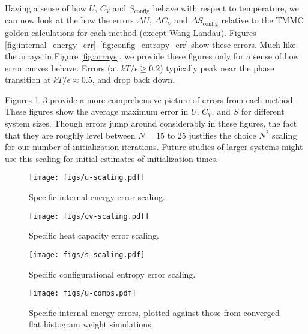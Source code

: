 \documentclass[11pt]{article}
\renewcommand{\t}{\text} %
\begin{document}
Having a sense of how $U$, $C_V$ and $S_{\t{config}}$ behave with
respect to temperature, we can now look at the how the errors $\Delta
U$, $\Delta C_V$ and $\Delta S_{\t{config}}$ relative to the TMMC
golden calculations for each method (except Wang-Landau). Figures
\ref{fig:internal_energy_err}--\ref{fig:config_entropy_err} show these
errors. Much like the arrays in Figure \ref{fig:arrays}, we provide
these figures only for a sense of how error curves behave. Errors (at
$kT/\epsilon\ge0.2$) typically peak near the phase transition at
$kT/\epsilon\approx0.5$, and drop back down.

Figures \ref{fig:u_scaling}--\ref{fig:s_scaling} provide a more
comprehensive picture of errors from each method. These figures show
the average maximum error in $U$, $C_V$, and $S$ for different system
sizes. Though errors jump around considerably in these figures, the
fact that they are roughly level between $N=15$ to $25$ justifies the
choice $N^2$ scaling for our number of initialization iterations.
Future studies of larger systems might use this scaling for initial
estimates of initialization times.

\begin{figure}[p]
  \centering
  \texttt{[image: figs/u-scaling.pdf]}
  \caption[Internal energy error scaling]
  {Specific internal energy error scaling.}
  \label{fig:u_scaling}
\end{figure}

\begin{figure}[p]
  \centering
  \texttt{[image: figs/cv-scaling.pdf]}
  \caption[Heat capacity error scaling]
  {Specific heat capacity error scaling.}
  \label{fig:cv_scaling}
\end{figure}

\begin{figure}[p]
  \centering
  \texttt{[image: figs/s-scaling.pdf]}
  \caption[Configurational entropy error scaling]
  {Specific configurational entropy error scaling.}
  \label{fig:s_scaling}
\end{figure}


\begin{figure}[p]
  \centering
  \texttt{[image: figs/u-comps.pdf]}
  \caption[Internal energy error comparisons]
  {Specific internal energy errors, plotted against those from
    converged flat histogram weight simulations.}
  \label{fig:u_comps}
\end{figure}
\end{document}
